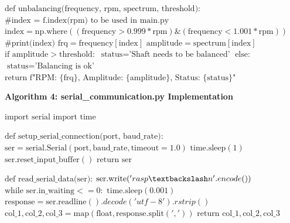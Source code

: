 \begin{algorithmic}[1]
	\STATE
	\STATE $\text{def unbalancing(frequency, rpm, spectrum, threshold):}$
	\STATE \hspace{0.5cm} $\text{\#index = f.index(rpm) to be used in main.py}$
	\STATE \hspace{0.5cm} $\text{index} = \text{np.where}((\text{frequency} > 0.999 * \text{rpm}) \& (\text{frequency} < 1.001 * \text{rpm}))$
	\STATE \hspace{0.5cm} $\text{\#print(index)}$
	\STATE \hspace{0.5cm} $\text{frq} = \text{frequency}[\text{index}]$
	\STATE \hspace{0.5cm} $\text{amplitude} = \text{spectrum}[\text{index}]$
	\STATE \hspace{0.5cm} $\text{if amplitude} > \text{threshold}:$
	\STATE \hspace{1.0cm} $\text{status} = \text{'Shaft needs to be balanced'}$
	\STATE \hspace{0.5cm} $\text{else:}$
	\STATE \hspace{1.0cm} $\text{status} = \text{'Balancing is ok'}$
	\STATE \hspace{0.5cm} $\text{return f"RPM: \{frq\}, Amplitude: \{amplitude\}, Status: \{status\}"}$
\end{algorithmic}

\clearpage


\noindent\textbf{Algorithm 4: serial\_communication.py Implementation}

\begin{algorithmic}[1]
	\STATE $\text{import serial}$
	\STATE $\text{import time}$
	
	\STATE
	\STATE $\text{def setup\_serial\_connection(port, baud\_rate):}$
	\STATE \hspace{0.5cm} $\text{ser} = \text{serial.Serial}(\text{port}, \text{baud\_rate}, \text{timeout} = 1.0)$
	\STATE \hspace{0.5cm} $\text{time.sleep}(1)$
	\STATE \hspace{0.5cm} $\text{ser.reset\_input\_buffer}()$
	\STATE \hspace{0.5cm} $\text{return ser}$
	
	\STATE
	\STATE $\text{def read\_serial\_data(ser):}$
	\STATE \hspace{0.5cm} $\text{ser.write}('rasp \textbackslash n'.encode())$
	\STATE \hspace{0.5cm} $\text{while ser.in\_waiting} <= 0:$
	\STATE \hspace{1.0cm} $\text{time.sleep}(0.001)$
	\STATE \hspace{0.5cm} $\text{response} = \text{ser.readline}().decode('utf-8').rstrip()$
	\STATE \hspace{0.5cm} $\text{col\_1}, \text{col\_2}, \text{col\_3} = \text{map}(\text{float}, \text{response.split}(','))$
	\STATE \hspace{0.5cm} $\text{return col\_1}, \text{col\_2}, \text{col\_3}$
\end{algorithmic}

